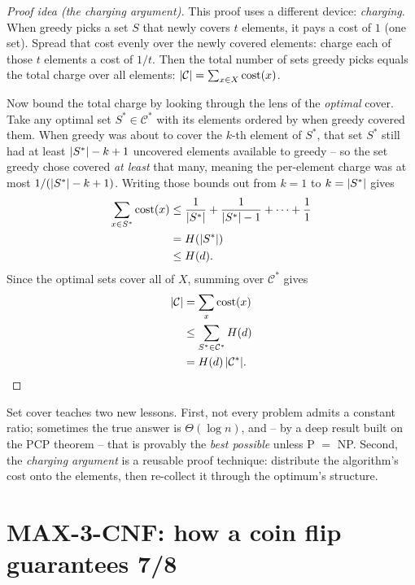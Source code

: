 \begin{proof}[Proof idea (the charging argument)]
This proof uses a different device: \emph{charging}. When greedy
picks a set $S$ that newly covers $t$ elements, it pays a cost of $1$ (one
set). Spread that cost evenly over the newly covered elements: charge each of
those $t$ elements a cost of $1/t$. Then the total number of sets greedy picks
equals the total charge over all elements:
$\lvert\mathcal{C}\rvert = \sum_{x\in X} \mathrm{cost}(x)$.

Now bound the total charge by looking through the lens of the \emph{optimal}
cover. Take any optimal set $S^{*}\in\mathcal{C}^{*}$ with its elements ordered
by when greedy covered them. When greedy was about to cover the $k$-th
element of $S^{*}$, that set $S^{*}$ still had at least $\lvert S^{*}\rvert-k+1$
uncovered elements available to greedy -- so the set greedy chose
covered \emph{at least} that many, meaning the per-element charge was at most
$1/(\lvert S^{*}\rvert-k+1)$. Writing those bounds out from $k=1$ to $k=\lvert S^{*}\rvert$ gives
\begin{align*}
\sum_{x\in S^{*}} \mathrm{cost}(x)
&\le \frac{1}{\lvert S^{*}\rvert} + \frac{1}{\lvert S^{*}\rvert-1} + \cdots + \frac{1}{1} \\
&= H(\lvert S^{*}\rvert) \\
&\le H(d).
\end{align*}
Since the optimal sets cover all of
$X$, summing over $\mathcal{C}^{*}$ gives
\begin{align*}
\lvert\mathcal{C}\rvert &= \sum_{x} \mathrm{cost}(x) \\
&\le \sum_{S^{*}\in\mathcal{C}^{*}} H(d) \\
&= H(d)\,\lvert\mathcal{C}^{*}\rvert. \qedhere
\end{align*}
\end{proof}

\begin{focusbox}
Set cover teaches two new lessons. First, not every problem admits a constant
ratio; sometimes the true answer is $\Theta(\log n)$, and -- by a deep
result built on the PCP theorem -- that is provably the \emph{best possible}
unless P $=$ NP. Second, the \emph{charging argument} is a reusable proof
technique: distribute the algorithm's cost onto the elements, then re-collect it
through the optimum's structure.
\end{focusbox}

\section{MAX-3-CNF: how a coin flip guarantees 7/8}

